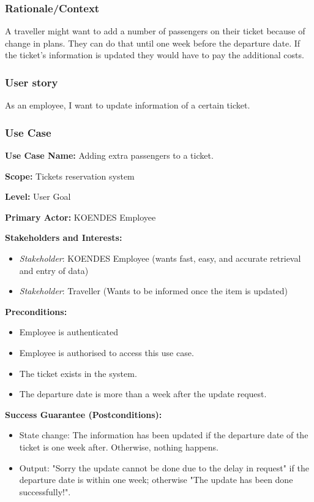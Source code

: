 \subsubsection{Rationale/Context}
A traveller might want to add a number of passengers on their ticket because of change in plans. They can do that until one week before the departure date. If the ticket's information is updated they would have to pay the additional costs.
\subsubsection{User story}
As an employee, I want to update information of a certain ticket.
\subsubsection{Use Case}
\creator{\studentB}
\updater{\studentC}
\secondUpdater{\studentA}

\textbf{Use Case Name:} Adding extra passengers to a ticket.

\textbf{Scope:} Tickets reservation system

\textbf{Level:} User Goal

\textbf{Primary Actor:} KOENDES Employee

\textbf{Stakeholders and Interests:} 
\begin{itemize}
\item \textit{Stakeholder}: KOENDES Employee (wants fast, easy, and accurate retrieval and entry of data)
\item \textit{Stakeholder}: Traveller (Wants to be informed once the item is updated)
\end{itemize}
\textbf{Preconditions:} 
\begin{itemize}
\item Employee is authenticated
\item Employee is authorised to access this use case.
\item The ticket exists in the system.
\item The departure date is more than a week after the update request.
\end{itemize}

\textbf{Success Guarantee (Postconditions):} 
\begin{itemize}
\item State change: The information has been updated if the departure date of the ticket is one week after. Otherwise, nothing happens. 
\item Output: "Sorry the update cannot be done due to the delay in request" if the departure date is within one week; otherwise "The update has been done successfully!".
\end{itemize}

